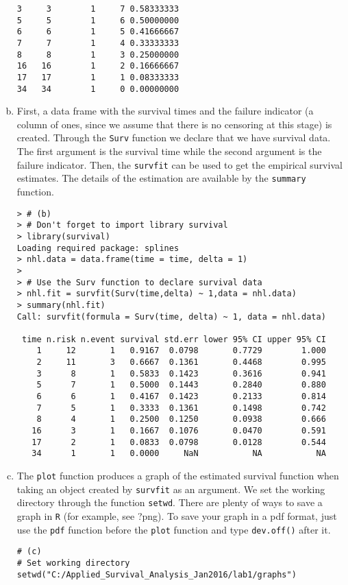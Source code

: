 \begin{enumerate}[(a)]
\begin{footnotesize}
\begin{verbatim}
3     3        1     7 0.58333333
5     5        1     6 0.50000000
6     6        1     5 0.41666667
7     7        1     4 0.33333333
8     8        1     3 0.25000000
16   16        1     2 0.16666667
17   17        1     1 0.08333333
34   34        1     0 0.00000000
\end{verbatim}
\end{footnotesize}
\item First, a data frame with the survival times and the failure indicator (a column of ones, since we assume that there is no censoring at this stage) is created.
Through the \verb|Surv| function we declare that we have survival data. The first argument is the survival time while the second argument is the failure indicator.
 Then, the \verb|survfit| can be used to get the empirical survival estimates. The details of the estimation are available by the \verb|summary| function.
\begin{footnotesize}
\begin{verbatim}
> # (b)
> # Don't forget to import library survival
> library(survival)
Loading required package: splines
> nhl.data = data.frame(time = time, delta = 1)
> 
> # Use the Surv function to declare survival data
> nhl.fit = survfit(Surv(time,delta) ~ 1,data = nhl.data)
> summary(nhl.fit)
Call: survfit(formula = Surv(time, delta) ~ 1, data = nhl.data)

 time n.risk n.event survival std.err lower 95% CI upper 95% CI
    1     12       1   0.9167  0.0798       0.7729        1.000
    2     11       3   0.6667  0.1361       0.4468        0.995
    3      8       1   0.5833  0.1423       0.3616        0.941
    5      7       1   0.5000  0.1443       0.2840        0.880
    6      6       1   0.4167  0.1423       0.2133        0.814
    7      5       1   0.3333  0.1361       0.1498        0.742
    8      4       1   0.2500  0.1250       0.0938        0.666
   16      3       1   0.1667  0.1076       0.0470        0.591
   17      2       1   0.0833  0.0798       0.0128        0.544
   34      1       1   0.0000     NaN           NA           NA
\end{verbatim}
\end{footnotesize}
\item The \verb|plot| function produces a graph of the estimated survival function when taking an object created by \verb|survfit| as an argument. We set the working directory through the function \verb|setwd|. There are plenty of ways to save a graph in \verb|R| (for example, see ?png). To save your graph in a pdf format, just use the \verb|pdf| function before the \verb|plot| function and type \verb|dev.off()| after it. 
\begin{footnotesize}
\begin{verbatim}
# (c)
# Set working directory
setwd("C:/Applied_Survival_Analysis_Jan2016/lab1/graphs")


\end{verbatim}
\end{footnotesize}
\end{enumerate}
